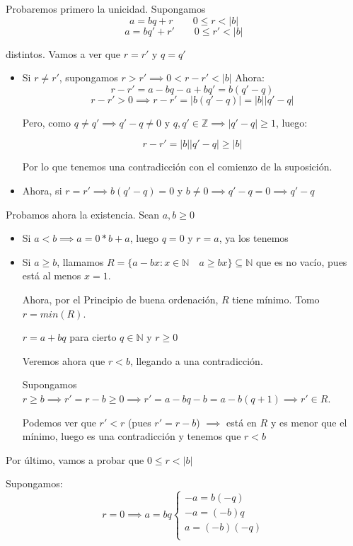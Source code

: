 \documentclass[11pt, a4paper, titlepage]{article}
\makeatletter
\renewenvironment{proof}[1][\proofname] {\vspace{-15pt}\par\pushQED{\qed}\normalfont\topsep6\p@\@plus6\p@\relax\trivlist\item[\hskip\labelsep\it#1\@addpunct{.}]\ignorespaces}{\popQED\endtrivlist\@endpefalse}
\providecommand{\ent}{\mathbb{Z}}
\providecommand{\nat}{\mathbb{N}}
\providecommand{\abs}[1]{\lvert#1\rvert}
\theoremstyle{theorem-style}
\theoremstyle{definition-style}
\theoremstyle{remark-style}
\theoremstyle{example-style}
\makeatother
\begin{document}
\begin{proof}
Probaremos primero la unicidad. Supongamos 
$$a=bq+r \quad \quad 0\leq r <\abs{b}$$   
$$a=bq'+r' \quad \quad 0 \leq r' < \abs{b}$$ 

distintos. Vamos a ver que $r=r'$ y $q=q'$

\begin{itemize}
	\item Si $r \neq r'$, supongamos $r > r' \implies 0 < r - r' < \abs{b}$
Ahora: 
$$ r-r' = a-bq - a +bq' = b(q' -q )$$
$$r-r' > 0 \implies r - r' = \abs{b(q' -q)} = \abs{b}\abs{q' -q}$$

Pero, como $q\neq q' \implies q'-q \neq 0$ y $q,q' \in \ent \implies \abs{q' -q} \geq 1 $, luego:

$$ r-r' = \abs{b}\abs{q' -q} \geq \abs{b}$$

Por lo que tenemos una contradicción con el comienzo de la suposición.

	\item Ahora, si $r=r'\implies b(q' -q) = 0$ y $b\neq 0 \implies q' -q=0 \implies q' -q$
\end{itemize}

Probamos ahora la existencia. Sean $a,b \geq 0$

\begin{itemize}
	\item Si $ a < b \implies a = 0*b + a$, luego $q=0$ y $r=a$, ya los tenemos
	\item Si $a \geq b$, llamamos $R=\{a-bx: x\in \nat \quad a \geq bx\}\subseteq \nat$ que es no vacío, pues está al menos $x=1$.
	
	Ahora, por el Principio de buena ordenación, $R$ tiene mínimo. Tomo $r=min(R)$. 
	
$r=a+bq$ para cierto $q \in \nat$ y $ r \geq 0$

Veremos ahora que $r < b$, llegando a una contradicción.

Supongamos $ r \geq b\implies r' = r-b \geq 0 \implies r' = a-bq -b = a -b(q+1)\implies r' \in R$.

Podemos ver que $r' < r$ (pues $r'=r-b$) $\implies $ está en $R$ y es menor que el mínimo, luego es una contradicción y tenemos que $r < b$

\end{itemize}
Por último, vamos a probar que $0 \leq r < \abs{b}$

Supongamos: 
\[
r=0 \implies a=bq \begin{cases}
	-a = b(-q)\\
	-a = (-b)q \\
	 a = (-b)(-q)\\	
\end{cases}
\]


\end{proof}
\end{document}
